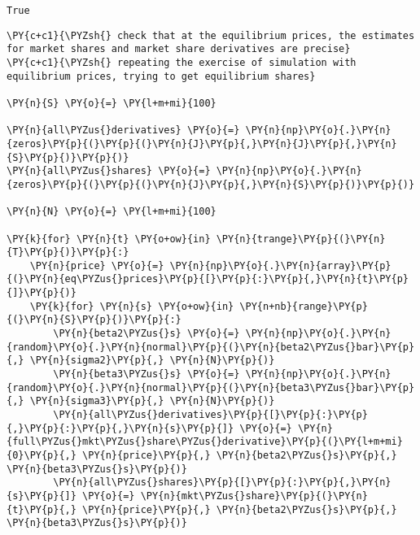     \begin{Verbatim}[commandchars=\\\{\}]

    \end{Verbatim}

            \begin{tcolorbox}[breakable, size=fbox, boxrule=.5pt, pad at break*=1mm, opacityfill=0]
\begin{Verbatim}[commandchars=\\\{\}]
True
\end{Verbatim}
\end{tcolorbox}

    \begin{tcolorbox}[breakable, size=fbox, boxrule=1pt, pad at break*=1mm,colback=cellbackground, colframe=cellborder]
\begin{Verbatim}[commandchars=\\\{\}]
\PY{c+c1}{\PYZsh{} check that at the equilibrium prices, the estimates for market shares and market share derivatives are precise}
\PY{c+c1}{\PYZsh{} repeating the exercise of simulation with equilibrium prices, trying to get equilibrium shares}

\PY{n}{S} \PY{o}{=} \PY{l+m+mi}{100}

\PY{n}{all\PYZus{}derivatives} \PY{o}{=} \PY{n}{np}\PY{o}{.}\PY{n}{zeros}\PY{p}{(}\PY{p}{(}\PY{n}{J}\PY{p}{,}\PY{n}{J}\PY{p}{,}\PY{n}{S}\PY{p}{)}\PY{p}{)}
\PY{n}{all\PYZus{}shares} \PY{o}{=} \PY{n}{np}\PY{o}{.}\PY{n}{zeros}\PY{p}{(}\PY{p}{(}\PY{n}{J}\PY{p}{,}\PY{n}{S}\PY{p}{)}\PY{p}{)}

\PY{n}{N} \PY{o}{=} \PY{l+m+mi}{100}

\PY{k}{for} \PY{n}{t} \PY{o+ow}{in} \PY{n}{trange}\PY{p}{(}\PY{n}{T}\PY{p}{)}\PY{p}{:}
    \PY{n}{price} \PY{o}{=} \PY{n}{np}\PY{o}{.}\PY{n}{array}\PY{p}{(}\PY{n}{eq\PYZus{}prices}\PY{p}{[}\PY{p}{:}\PY{p}{,}\PY{n}{t}\PY{p}{]}\PY{p}{)}
    \PY{k}{for} \PY{n}{s} \PY{o+ow}{in} \PY{n+nb}{range}\PY{p}{(}\PY{n}{S}\PY{p}{)}\PY{p}{:}
        \PY{n}{beta2\PYZus{}s} \PY{o}{=} \PY{n}{np}\PY{o}{.}\PY{n}{random}\PY{o}{.}\PY{n}{normal}\PY{p}{(}\PY{n}{beta2\PYZus{}bar}\PY{p}{,} \PY{n}{sigma2}\PY{p}{,} \PY{n}{N}\PY{p}{)}
        \PY{n}{beta3\PYZus{}s} \PY{o}{=} \PY{n}{np}\PY{o}{.}\PY{n}{random}\PY{o}{.}\PY{n}{normal}\PY{p}{(}\PY{n}{beta3\PYZus{}bar}\PY{p}{,} \PY{n}{sigma3}\PY{p}{,} \PY{n}{N}\PY{p}{)}
        \PY{n}{all\PYZus{}derivatives}\PY{p}{[}\PY{p}{:}\PY{p}{,}\PY{p}{:}\PY{p}{,}\PY{n}{s}\PY{p}{]} \PY{o}{=} \PY{n}{full\PYZus{}mkt\PYZus{}share\PYZus{}derivative}\PY{p}{(}\PY{l+m+mi}{0}\PY{p}{,} \PY{n}{price}\PY{p}{,} \PY{n}{beta2\PYZus{}s}\PY{p}{,} \PY{n}{beta3\PYZus{}s}\PY{p}{)}
        \PY{n}{all\PYZus{}shares}\PY{p}{[}\PY{p}{:}\PY{p}{,}\PY{n}{s}\PY{p}{]} \PY{o}{=} \PY{n}{mkt\PYZus{}share}\PY{p}{(}\PY{n}{t}\PY{p}{,} \PY{n}{price}\PY{p}{,} \PY{n}{beta2\PYZus{}s}\PY{p}{,} \PY{n}{beta3\PYZus{}s}\PY{p}{)}


\end{Verbatim}
\end{tcolorbox}
